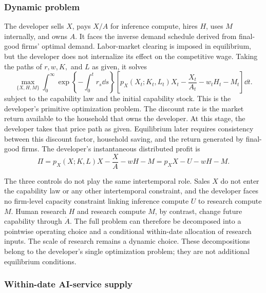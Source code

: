 \subsubsection{Dynamic problem}

The developer sells \(X\), pays \(X/A\) for inference compute, hires \(H\), uses
\(M\) internally, and owns \(A\). It faces the inverse demand schedule derived
from final-good firms' optimal demand. Labor-market clearing is imposed in
equilibrium, but the developer does not internalize its effect on the competitive
wage. Taking the paths of \(r,w,K,\) and \(L\) as given, it solves
\begin{equation}
 \max_{\{X,H,M\}}
 \int_0^\infty
 \exp\left\{-\int_0^t r_s\dd s\right\}
 \left[p_X(X_t;K_t,L_t)X_t-\frac{X_t}{A_t}-w_tH_t-M_t\right]\dd t.
 \label{eq:axm-developer-problem}
\end{equation}
subject to the capability law and the initial capability stock. This is the
developer's primitive optimization problem. The discount rate is the market
return available to the household that owns the developer. At this stage, the
developer takes that price path as given. Equilibrium later requires consistency
between this discount factor, household saving, and the return generated by
final-good firms. The developer's instantaneous distributed profit is
\begin{equation}
 \Pi=p_X(X;K,L)X-\frac{X}{A}-wH-M
 =p_XX-U-wH-M.
 \label{eq:axm-developer-profit}
\end{equation}

The three controls do not play the same intertemporal role. Sales \(X\) do not
enter the capability law or any other intertemporal constraint, and the developer
faces no firm-level capacity constraint linking inference compute \(U\) to
research compute \(M\). Human research \(H\) and research compute \(M\), by
contrast, change future capability through \(\dot A\). The full problem can
therefore be decomposed into a pointwise operating choice and a conditional
within-date allocation of research inputs. The scale of research remains a
dynamic choice. These decompositions belong to the developer's single
optimization problem; they are not additional equilibrium conditions.

\subsubsection{Within-date AI-service supply}

